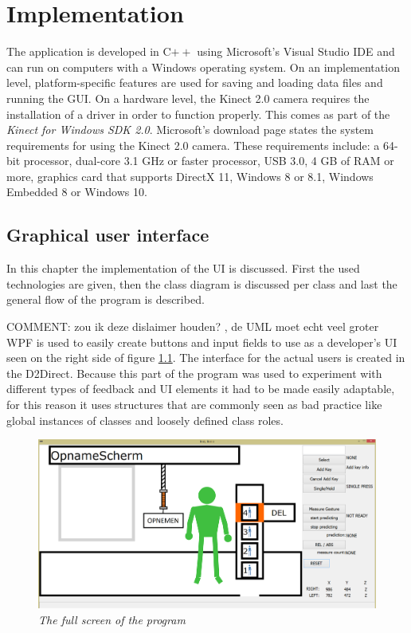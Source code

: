 \chapter{Implementation}

The application is developed in C$++$ using Microsoft's Visual Studio IDE and can run on computers with a Windows operating system. On an implementation level, platform-specific features are used for saving and loading data files and running the GUI. On a hardware level, the Kinect 2.0 camera requires the installation of a driver in order to function properly. This comes as part of the \emph{Kinect for Windows SDK 2.0}. Microsoft's download page states the system requirements for using the Kinect 2.0 camera. These requirements include: a 64-bit processor, dual-core 3.1 GHz or faster processor, USB 3.0, 4 GB of RAM or more, graphics card that supports DirectX 11, Windows 8 or 8.1, Windows Embedded 8 or Windows 10.\\


\section{Graphical user interface}



In this chapter the implementation of the UI is discussed. First the used technologies are given, then the class diagram is discussed per class and last the general flow of the program is described.

{\large COMMENT: zou ik deze dislaimer houden? , de UML moet echt veel groter} \\

WPF is used to easily create buttons and input fields to use as a developer's UI seen on the right side of figure \ref{real implementation}. The interface for the actual users is created in the D2Direct. Because this part of the program was used to experiment with different types of feedback and UI elements it had to be made easily adaptable, for this reason it uses structures that are commonly seen as bad practice like global instances of classes and loosely defined class roles.  

\begin{figure}[H]
	\begin{center}
		\includegraphics[width=14cm]{figures/1_full_screen_with_user.png}
		\caption{\emph{The full screen of the program}}
		\label{real implementation}
	\end{center}
\end{figure}

